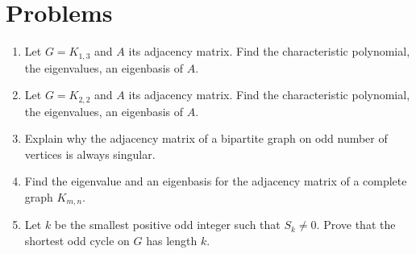 \documentclass{article}
\theoremstyle{definition}
\begin{document}
\section*{Problems}
\begin{enumerate}
\setlength\itemsep{2em}
\item Let $G = K_{1,3}$ and $A$ its adjacency matrix.  Find the characteristic polynomial, the eigenvalues, an eigenbasis of $A$.  
\item Let $G = K_{2,2}$ and $A$ its adjacency matrix.  Find the characteristic polynomial, the eigenvalues, an eigenbasis of $A$.  
\item Explain why the adjacency matrix of a bipartite graph on odd number of vertices is always singular.
\item Find the eigenvalue and an eigenbasis for the adjacency matrix of a complete graph $K_{m,n}$.  
\item Let $k$ be the smallest positive odd integer such that $S_k \neq 0$.  Prove that the shortest odd cycle on $G$ has length $k$.
\end{enumerate}

\end{document}
